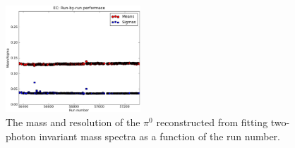 \begin{figure}[h]
\begin{center}
 \includegraphics[width=0.45\textwidth]{figures/calib/ec/ec_pi0mass.eps}
  \caption{The mass and resolution of the $\pi^0$ reconstructed from fitting two-photon invariant mass spectra as a function of the run number.}
  \label{ecpi0m}
  \end{center}
\end{figure}
%
%
%
%
\FloatBarrier
